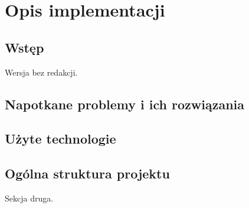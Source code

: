 \chapter{Opis implementacji}
\label{Chapter6}

\section{Wstęp}
\label{Chapter61}

{\color{red}Wersja bez redakcji.}


\section{Napotkane problemy i ich rozwiązania}
\label{Chapter62}

\section{Użyte technologie}
\label{Chapter63}




\section{Ogólna struktura projektu}
\label{Chapter64}

{\color{red}Sekcja druga.}






